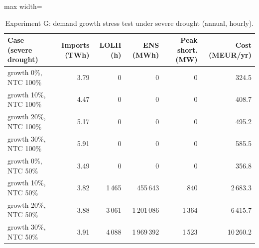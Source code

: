 \begin{table}[htbp]
\centering
\footnotesize
\caption{Experiment G: demand growth stress test under severe drought (annual, hourly).}
\label{tab:exp-G}
\begin{adjustbox}{max width=\linewidth}
\begin{tabular}{lrrrrr}
\toprule
Case (severe drought) & Imports (TWh) & LOLH (h) & ENS (MWh) & Peak short. (MW) & Cost (MEUR/yr) \\
\midrule
growth 0\%, NTC 100\% & 3.79 & 0 & 0 & 0 & 324.5 \\
growth 10\%, NTC 100\% & 4.47 & 0 & 0 & 0 & 408.7 \\
growth 20\%, NTC 100\% & 5.17 & 0 & 0 & 0 & 495.2 \\
growth 30\%, NTC 100\% & 5.91 & 0 & 0 & 0 & 585.5 \\
growth 0\%, NTC 50\% & 3.49 & 0 & 0 & 0 & 356.8 \\
growth 10\%, NTC 50\% & 3.82 & 1\,465 & 455\,643 & 840 & 2\,683.3 \\
growth 20\%, NTC 50\% & 3.88 & 3\,061 & 1\,201\,086 & 1\,364 & 6\,415.7 \\
growth 30\%, NTC 50\% & 3.91 & 4\,088 & 1\,969\,392 & 1\,523 & 10\,260.2 \\
\bottomrule
\end{tabular}
\end{adjustbox}
\end{table}
